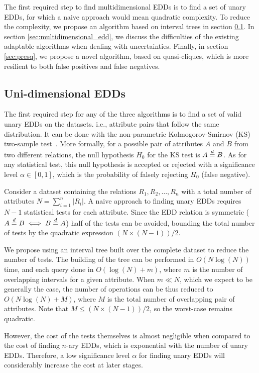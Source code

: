 The first required step to find multidimensional \glspl{EDD} is to
find a set of unary \glspl{EDD}, for which a naive approach would
mean quadratic complexity. To reduce the complexity, we
propose an algorithm based on interval trees in
section \ref{sec:unary}. In section
\ref{sec:multidimensional_edd}, we discuss the
difficulties of the existing adaptable algorithms
when dealing with uncertainties. Finally, in section
\ref{sec:presq}, we propose a novel algorithm, based on 
quasi-cliques, which is more resilient to both false positives
and false negatives.

\subsection{Uni-dimensional EDDs}
\label{sec:unary}

The first required step for any of the three algorithms is to find a set of valid unary
\glspl{EDD} on the datasets. i.e., attribute pairs that follow
the same distribution. It can be done with the non-parametric
Kolmogorov-Smirnov (KS) two-sample test~\cite{Hodges1958}.
More formally, for a possible pair of attributes $A$ and $B$ from two different relations,
the null hypothesis $H_0$ for the KS test is $A \stackrel{d}{=} B$. As for any statistical test,
this null hypothesis is accepted or rejected with a significance level $\alpha \in [0,1]$,
which is the probability of falsely rejecting $H_0$ (false negative).

Consider a dataset containing the relations $R_1,R_2,\ldots,R_n$ with a total number of
attributes $N = \sum_{i=1}^n |R_i|$. A naive approach to finding unary \glspl{EDD} requires $N - 1$
statistical tests for each attribute. Since the \gls{EDD} relation is symmetric
($A \stackrel{d}{=} B \iff B \stackrel{d}{=} A$) half of the tests can be avoided, bounding the total number
of tests by the quadratic expression $(N \times (N - 1)) / 2$.

We propose using an interval tree built over the complete dataset to reduce the number of tests.
The building of the tree can be performed in $O(N \log(N))$ time, and each query done in
$O(\log(N) + m)$, where $m$ is the number of overlapping intervals for a given attribute.
When $m \ll N$, which we expect to be generally the case, the number of operations can be thus
reduced to $O(N \log(N) + M)$, where $M$ is the total number of overlapping pair of attributes.
Note that $M \le (N \times (N - 1)) / 2$, so the worst-case remains quadratic.

However, the cost of the tests themselves is almost negligible when compared to the cost of
finding $n$-ary \glspl{EDD}, which is exponential with
the number of unary \glspl{EDD}. Therefore, a low significance level $\alpha$ for finding unary \glspl{EDD}
will considerably increase the cost at later stages.

